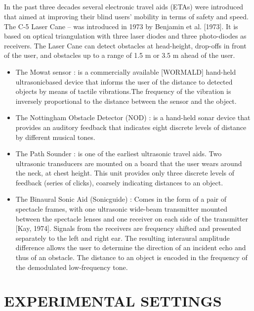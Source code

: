 \documentclass[11pt,a4paper,twoside]{report}
\begin{document}
\paragraph{ }In the past three decades several electronic travel aids (ETAs) were introduced that
aimed at improving their blind users’ mobility in terms of safety and speed. The C-5
Laser Cane – was introduced in 1973 by Benjamin et al. [1973]. It is based on optical
triangulation with three laser diodes and three photo-diodes as receivers. The Laser
Cane can detect obstacles at head-height, drop-offs in front of the user, and obstacles
up to a range of 1.5 m or 3.5 m ahead of the user.
\begin{itemize}
\item The Mowat sensor : is a commercially available [WORMALD] hand-held ultrasonicbased device that informs the user of the distance to detected objects by means of
tactile vibrations.The frequency of the vibration is inversely proportional to the distance
between the sensor and the object.
\item The Nottingham Obstacle Detector (NOD) : is a hand-held sonar device that provides
an auditory feedback that indicates eight discrete levels of distance by different
musical tones.
\item The Path Sounder : is one of the earliest ultrasonic travel aids. Two ultrasonic transducers are mounted on a board that the user wears around the neck, at chest height. This
unit provides only three discrete levels of feedback (series of clicks), coarsely indicating
distances to an object.
\item The Binaural Sonic Aid (Sonicguide) : Comes in the form of a pair of spectacle frames,
with one ultrasonic wide-beam transmitter mounted between the spectacle lenses and
one receiver on each side of the transmitter [Kay, 1974]. Signals from the receivers are
frequency shifted and presented separately to the left and right ear. The resulting interaural
amplitude difference allows the user to determine the direction of an incident echo
and thus of an obstacle. The distance to an object is encoded in the frequency of the
demodulated low-frequency tone. 

\end{itemize}

\chapter{EXPERIMENTAL SETTINGS}
\end{document}
